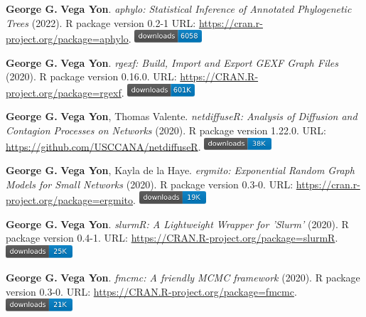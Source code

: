 \documentclass[letterpaper, 10pt]{article}
\begin{document}
\begin{enumerate}[label={[}\arabic*{]},labelindent=5\parindent,labelsep=8pt]
\item {\bfseries George G.} {\bfseries Vega Yon}. \textit{{aphylo: Statistical Inference of Annotated Phylogenetic Trees}} (2022). R package version 0.2-1 {\small URL}: \url{https://cran.r-project.org/package=aphylo}. \includegraphics[width=2.5cm]{fig/cran-downloads-aphylo.pdf}
\item {\bfseries George G.} {\bfseries Vega Yon}. \textit{rgexf: Build, Import and Export GEXF Graph Files} (2020). R package version 0.16.0. {\small URL}: \url{https://CRAN.R-project.org/package=rgexf}. \includegraphics[width=2.5cm]{fig/cran-downloads-rgexf.pdf} 
\item {\bfseries George G.} {\bfseries Vega Yon}, Thomas Valente. \textit{{{netdiffuseR: Analysis of Diffusion and Contagion Processes on Networks}}} (2020). R package version 1.22.0. {\small URL}: \url{https://github.com/USCCANA/netdiffuseR}. \includegraphics[width=2.5cm]{fig/cran-downloads-netdiffuser.pdf} 
\item {\bfseries George G.} {\bfseries Vega Yon}, Kayla de la Haye. \textit{ergmito: Exponential Random Graph Models for Small Networks} (2020). R package version 0.3-0. {\small URL}: \url{https://cran.r-project.org/package=ergmito}. \includegraphics[width=2.5cm]{fig/cran-downloads-ergmito.pdf} 
\item {\bfseries George G.} {\bfseries Vega Yon}. \textit{slurmR: A Lightweight Wrapper for 'Slurm'} (2020). R package version 0.4-1. {\small URL}: \url{https://CRAN.R-project.org/package=slurmR}. \includegraphics[width=2.5cm]{fig/cran-downloads-slurmr.pdf} 
\item {\bfseries George G.} {\bfseries Vega Yon}. \textit{fmcmc: A friendly MCMC framework} (2020). R package version 0.3-0. {\small URL}: \url{https://CRAN.R-project.org/package=fmcmc}. \includegraphics[width=2.5cm]{fig/cran-downloads-fmcmc.pdf} 
\end{enumerate}
\end{document}
